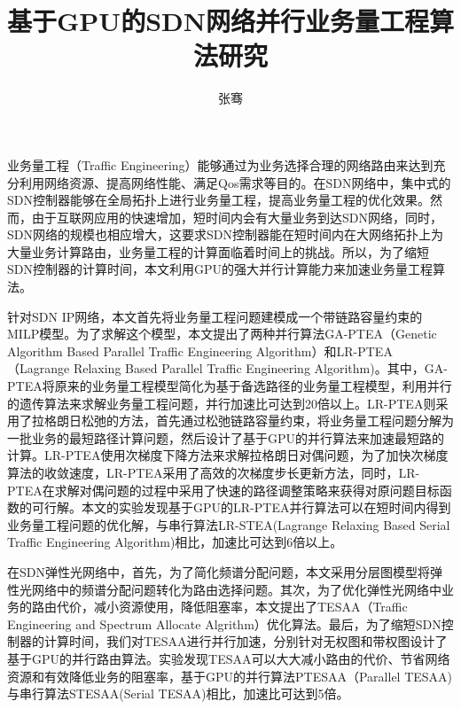 \documentclass[master]{thesis-uestc}
\title{基于GPU的SDN网络并行业务量工程算法研究}
\author{张骞}
\begin{document}
\begin{chineseabstract}
业务量工程（Traffic Engineering）能够通过为业务选择合理的网络路由来达到充分利用网络资源、提高网络性能、满足Qos需求等目的。在SDN网络中，集中式的SDN控制器能够在全局拓扑上进行业务量工程，提高业务量工程的优化效果。然而，由于互联网应用的快速增加，短时间内会有大量业务到达SDN网络，同时，SDN网络的规模也相应增大，这要求SDN控制器能在短时间内在大网络拓扑上为大量业务计算路由，业务量工程的计算面临着时间上的挑战。所以，为了缩短SDN控制器的计算时间，本文利用GPU的强大并行计算能力来加速业务量工程算法。

针对SDN IP网络，本文首先将业务量工程问题建模成一个带链路容量约束的MILP模型。为了求解这个模型，本文提出了两种并行算法GA-PTEA（Genetic Algorithm Based Parallel Traffic Engineering Algorithm）和LR-PTEA（Lagrange Relaxing Based Parallel Traffic Engineering Algorithm)。其中，GA-PTEA将原来的业务量工程模型简化为基于备选路径的业务量工程模型，利用并行的遗传算法来求解业务量工程问题，并行加速比可达到20倍以上。LR-PTEA则采用了拉格朗日松弛的方法，首先通过松弛链路容量约束，将业务量工程问题分解为一批业务的最短路径计算问题，然后设计了基于GPU的并行算法来加速最短路的计算。LR-PTEA使用次梯度下降方法来求解拉格朗日对偶问题，为了加快次梯度算法的收敛速度，LR-PTEA采用了高效的次梯度步长更新方法，同时，LR-PTEA在求解对偶问题的过程中采用了快速的路径调整策略来获得对原问题目标函数的可行解。本文的实验发现基于GPU的LR-PTEA并行算法可以在短时间内得到业务量工程问题的优化解，与串行算法LR-STEA(Lagrange Relaxing Based Serial Traffic Engineering Algorithm)相比，加速比可达到6倍以上。

在SDN弹性光网络中，首先，为了简化频谱分配问题，本文采用分层图模型将弹性光网络中的频谱分配问题转化为路由选择问题。其次，为了优化弹性光网络中业务的路由代价，减小资源使用，降低阻塞率，本文提出了TESAA（Traffic Engineering and Spectrum Allocate Algrithm）优化算法。最后，为了缩短SDN控制器的计算时间，我们对TESAA进行并行加速，分别针对无权图和带权图设计了基于GPU的并行路由算法。实验发现TESAA可以大大减小路由的代价、节省网络资源和有效降低业务的阻塞率，基于GPU的并行算法PTESAA（Parallel TESAA)与串行算法STESAA(Serial TESAA)相比，加速比可达到5倍。

\end{chineseabstract}
\end{document}
